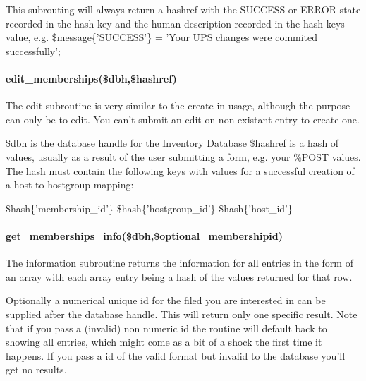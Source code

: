 \documentclass{book}
\begin{document}
This subrouting will always return a hashref with the SUCCESS or ERROR state recorded in the hash key and the human description recorded in the hash keys value, e.g. \$message\{'SUCCESS'\} = 'Your UPS changes were commited successfully';


\paragraph*{edit\protect\_memberships(\$dbh,\$hashref)}
\label{Inventory::Memberships_edit_memberships_dbh_hashref_}
\hypertarget{Inventory::Memberships_edit_memberships_dbh_hashref_}{}



The edit subroutine is very similar to the create in usage, although the purpose can only be to edit. You can't submit an edit on non existant entry to create one.



\$dbh is the database handle for the Inventory Database \$hashref is a hash of values, usually as a result of the user submitting a form, e.g. your \%POST values. The hash must contain the following keys with values for a successful creation of a host to hostgroup mapping:



\$hash\{'membership\_id'\} \$hash\{'hostgroup\_id'\} \$hash\{'host\_id'\}


\paragraph*{get\protect\_memberships\protect\_info(\$dbh,\$optional\protect\_membershipid)}
\label{Inventory::Memberships_get_memberships_info_dbh_optional_membershipid_}
\hypertarget{Inventory::Memberships_get_memberships_info_dbh_optional_membershipid_}{}



The information subroutine returns the information for all entries in the form of an array with each array entry being a hash of the values returned for that row.



Optionally a numerical unique id for the filed you are interested in can be supplied after the database handle. This will return only one specific result. Note that if you pass a (invalid) non numeric id the routine will default back to showing all entries, which might come as a bit of a shock the first time it happens. If you pass a id of the valid format but invalid to the database you'll get no results.
\end{document}
